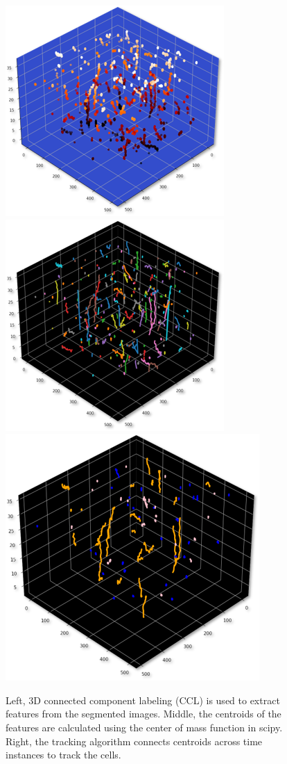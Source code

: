 \documentclass[./dissertation.tex]{subfiles}
\begin{document}
\begin{figure}[h]
    \centering\includegraphics[width=.3\textwidth]{figures/tseg/centers.png}
    \centering\includegraphics[width=.3\textwidth]{figures/tseg/tracking.png}
    \centering\includegraphics[width=.3\textwidth]{figures/tseg/trajs.png}
    \caption{Left, 3D connected component labeling (CCL) is used to extract features from the segmented images. Middle, the centroids of the features are calculated using the center of mass function in scipy. Right, the tracking algorithm connects centroids across time instances to track the cells.}
    \label{fig:tracking_plots}
\end{figure}
\end{document}
